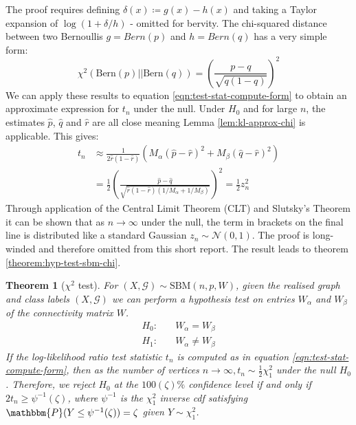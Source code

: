 \documentclass[11pt]{article}
\newcommand{\Gaussian}{\mathcal{N}}
\newcommand{\Gcal}{\mathcal{G}}
\newcommand{\prob}{\mathbbm{P}}
\newtheorem{theorem}{Theorem}[section]
\begin{document}
\begin{multicols*}{2}
The proof requires defining $\delta(x) \coloneqq g(x) - h(x)$ and taking a Taylor expansion of $\log (1 + \delta / h)$ - omitted for bervity. The chi-squared distance between two Bernoullis $g = Bern(p)$ and $h = Bern(q)$ has a very simple form:
%
\begin{equation}
\chi^2(\textrm{Bern}(p) || \textrm{Bern}(q)) = \left( \frac{p-q}{\sqrt{q(1-q)}} \right)^2
\end{equation}
%
We can apply these results to equation \ref{eqn:test-stat-compute-form} to obtain an approximate expression for $t_n$ under the null. Under $H_0$ and for large $n$, the estimates $\hat{p}$, $\hat{q}$ and $\hat{r}$ are all close meaning Lemma \ref{lem:kl-approx-chi} is applicable. This gives:
%
\begin{align}
	t_n &\approx \frac{1}{2 \hat{r}(1 - \hat{r})} \left( 
	M_\alpha \left(\hat{p} - \hat{r}\right)^2 +
	M_\beta \left(\hat{q} - \hat{r} \right)^2 
	\right) \nonumber \\
	&= \frac{1}{2} \left( \frac{\hat{p} - \hat{q}}{\sqrt{\hat{r}(1- \hat{r})(1/M_\alpha + 1/M_\beta)}} \right)^2
	= \frac{1}{2} z_n^2
\end{align}
%
Through application of the Central Limit Theorem (CLT) and Slutsky's Theorem it can be shown that as $n \rightarrow \infty$ under the null, the term in brackets on the final line is distributed like a standard Gaussian $z_n \sim \Gaussian(0,1)$. The proof is long-winded and therefore omitted from this short report. The result leads to theorem \ref{theorem:hyp-test-sbm-chi}.

\begin{theorem}[$\chi^2$ test]
	For $(X, \Gcal) \sim \textrm{SBM}(n, p, W)$, given the realised graph and class labels $(X, \Gcal)$ we can perform a hypothesis test on entries $W_\alpha$ and $W_\beta$ of the connectivity matrix $W$.
	\begin{align*}
	H_0:& \quad W_{\alpha} = W_{\beta} \\
	H_1:& \quad W_{\alpha} \neq W_{\beta}
	\end{align*}
	If the log-likelihood ratio test statistic $t_n$ is computed as in equation \ref{eqn:test-stat-compute-form}, then as the number of vertices $n \rightarrow \infty, t_n \sim \frac{1}{2} \chi^2_1$ under the null $H_0$. Therefore, we reject $H_0$ at the $100(\zeta)\%$ confidence level if and only if $2t_n \geq \psi^{-1}(\zeta)$, where $\psi^{-1}$ is the $\chi^2_1$ inverse cdf satisfying $\prob(Y \leq \psi^{-1}(\zeta)) = \zeta$ given $Y \sim \chi^2_1$.
	

\end{theorem}
\end{multicols*}
\end{document}
